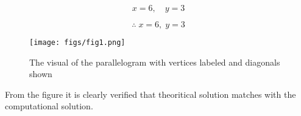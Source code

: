 \documentclass[journal]{IEEEtran}
\begin{document}
\begin{equation}
x = 6, 
\quad 
y = 3
\end{equation}

\begin{equation}
\therefore \; x=6, \; y=3
\end{equation}

\begin{figure}[H]
   
    \texttt{[image: figs/fig1.png]}
\caption{The visual of the parallelogram with vertices labeled and diagonals shown}
    \label{fig:figs/fig1.png}
\end{figure}
\noindent
From the figure it is clearly verified that theoritical solution matches with the computational solution.
\end{document}
